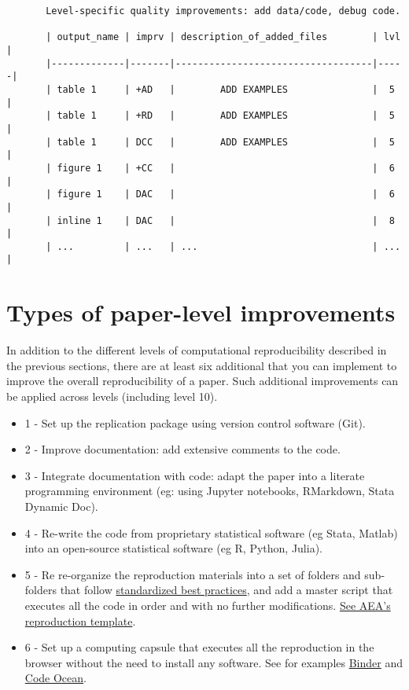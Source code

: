 \documentclass[]{book}
\providecommand{\tightlist}{%
  \setlength{\itemsep}{0pt}\setlength{\parskip}{0pt}}
\begin{document}
\begin{verbatim}
       Level-specific quality improvements: add data/code, debug code.

       | output_name | imprv | description_of_added_files        | lvl |
       |-------------|-------|-----------------------------------|-----|
       | table 1     | +AD   |        ADD EXAMPLES               |  5  |
       | table 1     | +RD   |        ADD EXAMPLES               |  5  |
       | table 1     | DCC   |        ADD EXAMPLES               |  5  |
       | figure 1    | +CC   |                                   |  6  |
       | figure 1    | DAC   |                                   |  6  |
       | inline 1    | DAC   |                                   |  8  |
       | ...         | ...   | ...                               | ... |  
\end{verbatim}

\hypertarget{paper-level}{%
\section{Types of paper-level improvements}\label{paper-level}}

In addition to the different levels of computational reproducibility described in the previous sections, there are at least six additional that you can implement to improve the overall reproducibility of a paper. Such additional improvements can be applied across levels (including level 10).

\begin{itemize}
\tightlist
\item
  1 - Set up the replication package using version control software (Git).
\item
  2 - Improve documentation: add extensive comments to the code.
\item
  3 - Integrate documentation with code: adapt the paper into a literate programming environment (eg: using Jupyter notebooks, RMarkdown, Stata Dynamic Doc).
\item
  4 - Re-write the code from proprietary statistical software (eg Stata, Matlab) into an open-source statistical software (eg R, Python, Julia).
\item
  5 - Re re-organize the reproduction materials into a set of folders and sub-folders that follow \href{https://www.projecttier.org/tier-protocol/specifications/\#overview-of-the-documentation}{standardized best practices}, and add a master script that executes all the code in order and with no further modifications. \href{https://github.com/AEADataEditor/replication-template}{See AEA's reproduction template}.\\
\item
  6 - Set up a computing capsule that executes all the reproduction in the browser without the need to install any software. See for examples \href{https://mybinder.org/}{Binder} and \href{https://codeocean.com/}{Code Ocean}.
\end{itemize}
\end{document}
